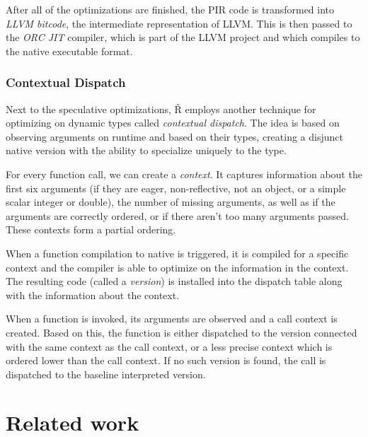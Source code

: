 After all of the optimizations are finished, the PIR code is transformed into \textit{LLVM bitcode}, the intermediate representation of LLVM. This is then passed to the \textit{ORC JIT} compiler, which is part of the LLVM project and which compiles to the native executable format.

\subsubsection*{Contextual Dispatch}\label{ch:1-ctx-dispatch}

Next to the speculative optimizations, Ř employs another technique for optimizing on dynamic types called \textit{contextual dispatch}\cite{ctx-dispatch}. The idea is based on observing arguments on runtime and based on their types, creating a disjunct native version with the ability to specialize uniquely to the type.

For every function call, we can create a \textit{context}. It captures information about the first six arguments (if they are eager, non-reflective, not an object, or a simple scalar integer or double), the number of missing arguments, as well as if the arguments are correctly ordered, or if there aren’t too many arguments passed. These contexts form a partial ordering.

When a function compilation to native is triggered, it is compiled for a specific context and the compiler is able to optimize on the information in the context. The resulting code (called a \textit{version}) is installed into the dispatch table along with the information about the context.

When a function is invoked, its arguments are observed and a call context is created. Based on this, the function is either dispatched to the version connected with the same context as the call context, or a less precise context which is ordered lower than the call context. If no such version is found, the call is dispatched to the baseline interpreted version.

\section{Related work}

\todoadd

